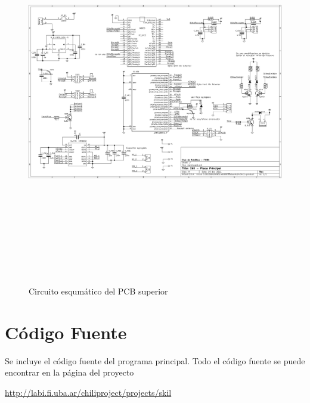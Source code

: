 \documentclass[12pt,a4paper]{article}
\begin{document}
\begin{figure}[h!]
  \begin{center}
    \includegraphics[height=17cm,angle=90]{img/mainboard}
  \end{center}
  \vspace{-0.8cm}
  \caption{Circuito esqumático del PCB superior}
  \label{fig:mainboard}
\end{figure}


\clearpage

\section{Código Fuente}

Se incluye el código fuente del programa principal. Todo el código fuente se puede encontrar en la página del proyecto

\url{http://labi.fi.uba.ar/chiliproject/projects/skil}

{
\footnotesize


}
\end{document}
